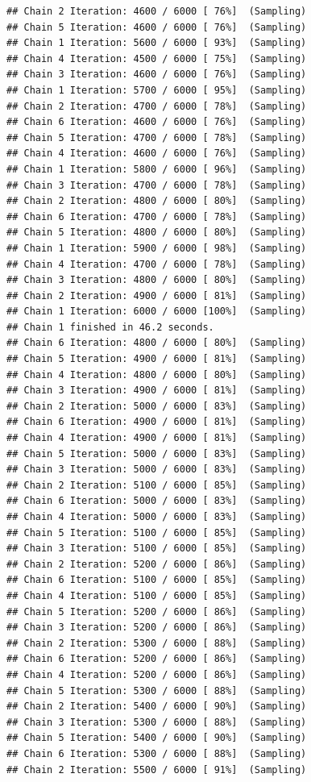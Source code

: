 \documentclass[
]{article}
\begin{document}
\begin{verbatim}
## Chain 2 Iteration: 4600 / 6000 [ 76%]  (Sampling) 
## Chain 5 Iteration: 4600 / 6000 [ 76%]  (Sampling) 
## Chain 1 Iteration: 5600 / 6000 [ 93%]  (Sampling) 
## Chain 4 Iteration: 4500 / 6000 [ 75%]  (Sampling) 
## Chain 3 Iteration: 4600 / 6000 [ 76%]  (Sampling) 
## Chain 1 Iteration: 5700 / 6000 [ 95%]  (Sampling) 
## Chain 2 Iteration: 4700 / 6000 [ 78%]  (Sampling) 
## Chain 6 Iteration: 4600 / 6000 [ 76%]  (Sampling) 
## Chain 5 Iteration: 4700 / 6000 [ 78%]  (Sampling) 
## Chain 4 Iteration: 4600 / 6000 [ 76%]  (Sampling) 
## Chain 1 Iteration: 5800 / 6000 [ 96%]  (Sampling) 
## Chain 3 Iteration: 4700 / 6000 [ 78%]  (Sampling) 
## Chain 2 Iteration: 4800 / 6000 [ 80%]  (Sampling) 
## Chain 6 Iteration: 4700 / 6000 [ 78%]  (Sampling) 
## Chain 5 Iteration: 4800 / 6000 [ 80%]  (Sampling) 
## Chain 1 Iteration: 5900 / 6000 [ 98%]  (Sampling) 
## Chain 4 Iteration: 4700 / 6000 [ 78%]  (Sampling) 
## Chain 3 Iteration: 4800 / 6000 [ 80%]  (Sampling) 
## Chain 2 Iteration: 4900 / 6000 [ 81%]  (Sampling) 
## Chain 1 Iteration: 6000 / 6000 [100%]  (Sampling) 
## Chain 1 finished in 46.2 seconds.
## Chain 6 Iteration: 4800 / 6000 [ 80%]  (Sampling) 
## Chain 5 Iteration: 4900 / 6000 [ 81%]  (Sampling) 
## Chain 4 Iteration: 4800 / 6000 [ 80%]  (Sampling) 
## Chain 3 Iteration: 4900 / 6000 [ 81%]  (Sampling) 
## Chain 2 Iteration: 5000 / 6000 [ 83%]  (Sampling) 
## Chain 6 Iteration: 4900 / 6000 [ 81%]  (Sampling) 
## Chain 4 Iteration: 4900 / 6000 [ 81%]  (Sampling) 
## Chain 5 Iteration: 5000 / 6000 [ 83%]  (Sampling) 
## Chain 3 Iteration: 5000 / 6000 [ 83%]  (Sampling) 
## Chain 2 Iteration: 5100 / 6000 [ 85%]  (Sampling) 
## Chain 6 Iteration: 5000 / 6000 [ 83%]  (Sampling) 
## Chain 4 Iteration: 5000 / 6000 [ 83%]  (Sampling) 
## Chain 5 Iteration: 5100 / 6000 [ 85%]  (Sampling) 
## Chain 3 Iteration: 5100 / 6000 [ 85%]  (Sampling) 
## Chain 2 Iteration: 5200 / 6000 [ 86%]  (Sampling) 
## Chain 6 Iteration: 5100 / 6000 [ 85%]  (Sampling) 
## Chain 4 Iteration: 5100 / 6000 [ 85%]  (Sampling) 
## Chain 5 Iteration: 5200 / 6000 [ 86%]  (Sampling) 
## Chain 3 Iteration: 5200 / 6000 [ 86%]  (Sampling) 
## Chain 2 Iteration: 5300 / 6000 [ 88%]  (Sampling) 
## Chain 6 Iteration: 5200 / 6000 [ 86%]  (Sampling) 
## Chain 4 Iteration: 5200 / 6000 [ 86%]  (Sampling) 
## Chain 5 Iteration: 5300 / 6000 [ 88%]  (Sampling) 
## Chain 2 Iteration: 5400 / 6000 [ 90%]  (Sampling) 
## Chain 3 Iteration: 5300 / 6000 [ 88%]  (Sampling) 
## Chain 5 Iteration: 5400 / 6000 [ 90%]  (Sampling) 
## Chain 6 Iteration: 5300 / 6000 [ 88%]  (Sampling) 
## Chain 2 Iteration: 5500 / 6000 [ 91%]  (Sampling) 

\end{verbatim}
\end{document}
